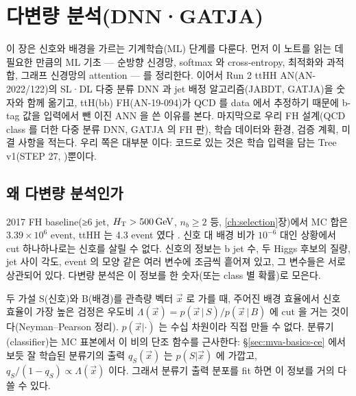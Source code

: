 \chapter{다변량 분석(DNN·GATJA)}\label{ch:mva}

이 장은 신호와 배경을 가르는 기계학습(ML) 단계를 다룬다. 먼저 이 노트를 읽는 데 필요한 만큼의 ML 기초
— 순방향 신경망, softmax 와 cross-entropy, 최적화와 과적합, 그래프 신경망의 attention — 를 정리한다.
이어서 Run 2 ttHH AN(AN-2022/122)의 SL·DL 다중 분류 DNN 과 jet 배정 알고리즘(JABDT, GATJA)을 숫자와 함께 옮기고,
ttH(bb) FH(AN-19-094)가 QCD 를 data 에서 추정하기 때문에 b-tag 값을 입력에서 뺀 이진 ANN 을 쓴 이유를 본다.
마지막으로 우리 FH 설계(QCD class 를 더한 다중 분류 DNN, GATJA 의 FH 판), 학습 데이터와 환경, 검증 계획, 미결 사항을 적는다.
우리 쪽은 대부분 \tagplan 이다: 코드로 있는 것은 학습 입력을 담는 Tree v1(STEP 27, \tagimpl\tagtest)뿐이다.

\section{왜 다변량 분석인가}\label{sec:mva-why}

2017 FH baseline(≥6 jet, $H_{\mathrm{T}}>500\,\mathrm{GeV}$, $n_b\ge2$ 등, \ref{ch:selection}장)에서 MC 합은 $3.39\times10^{6}$ event, ttHH 는 4.3 event 였다
. 신호 대 배경 비가 $10^{-6}$ 대인 상황에서 cut 하나하나로는 신호를 살릴 수 없다.
신호의 정보는 b jet 수, 두 Higgs 후보의 질량, jet 사이 각도, event 의 모양 같은 여러 변수에 조금씩 흩어져 있고,
그 변수들은 서로 상관되어 있다. 다변량 분석은 이 정보를 한 숫자(또는 class 별 확률)로 모은다.

\begin{note}
두 가설 S(신호)와 B(배경)를 관측량 벡터 $\vec{x}$ 로 가를 때, 주어진 배경 효율에서 신호 효율이 가장 높은 검정은
우도비 $\Lambda(\vec{x})=p(\vec{x}\,|\,S)/p(\vec{x}\,|\,B)$ 에 cut 을 거는 것이다(Neyman–Pearson 정리).
$p(\vec{x}|\cdot)$ 는 수십 차원이라 직접 만들 수 없다. 분류기(classifier)는 MC 표본에서 이 비의 단조 함수를 근사한다:
\S\ref{sec:mva-basics-ce} 에서 보듯 잘 학습된 분류기의 출력 $q_S(\vec{x})$ 는 $p(S|\vec{x})$ 에 가깝고,
$q_S/(1-q_S)\propto\Lambda(\vec{x})$ 이다. 그래서 분류기 출력 분포를 fit 하면 이 정보를 거의 다 쓸 수 있다.
\end{note}

